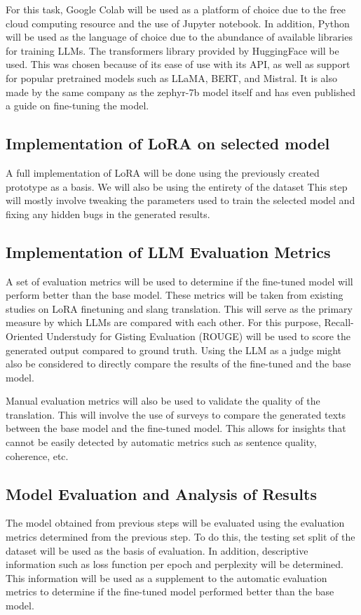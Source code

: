For this task, Google Colab will be used as a platform of choice due to the free cloud computing resource and the use of Jupyter notebook.
In addition, Python will be used as the language of choice due to the abundance of available libraries for training LLMs. The transformers library provided by HuggingFace will be used.
This was chosen because of its ease of use with its API, as well as support for popular pretrained models such as LLaMA, BERT, and Mistral.
It is also made by the same company as the zephyr-7b model itself and has even published a guide on fine-tuning the model.

\subsection{Implementation of LoRA on selected model}
A full implementation of LoRA will be done using the previously created prototype as a basis.
We will also be using the entirety of the dataset
This step will mostly involve tweaking the parameters used to train the selected model and fixing any hidden bugs in the generated results.

\subsection{Implementation of LLM Evaluation Metrics}
A set of evaluation metrics will be used to determine if the fine-tuned model will perform better than the base model.
These metrics will be taken from existing studies on LoRA finetuning and slang translation.
This will serve as the primary measure by which LLMs are compared with each other.
For this purpose, Recall-Oriented Understudy for Gisting Evaluation (ROUGE) will be used to score the generated output compared to ground truth.
Using the LLM as a judge might also be considered to directly compare the results of the fine-tuned and the base model.

Manual evaluation metrics will also be used to validate the quality of the translation.
This will involve the use of surveys to compare the generated texts between the base model and the fine-tuned model.
This allows for insights that cannot be easily detected by automatic metrics such as sentence quality, coherence, etc.

\subsection{Model Evaluation and Analysis of Results}
The model obtained from previous steps will be evaluated using the evaluation metrics determined from the previous step.
To do this, the testing set split of the dataset will be used as the basis of evaluation.
In addition, descriptive information such as loss function per epoch and perplexity will be determined.
This information will be used as a supplement to the automatic evaluation metrics to determine if the fine-tuned model performed better than the base model.

